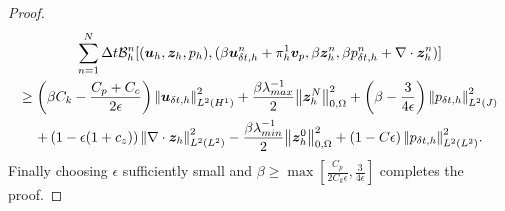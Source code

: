 \begin{proof}
\begin{multline}
\sum_{n=1}^{N} \Delta t  \mathcal{B}_{h}^{n}[\disctriple, ( \beta \dispdisctimediscn + \projscott {\vp},  \beta \fluxdisc^{n}, \beta\pdisctimediscn   + \nabla \cdot \fluxdisc^{n}  )]  \\
\geq \left( \beta C_{k}  - \frac{C_{p}+C_{c}}{2 \epsilon } \right) \honetimenorm{\dispdisctimedisc}^{2}    + \frac{\beta\lambda_{max}^{-1}}{2} \ltwonorm{\fluxdisc^{N}}^{2}  +\left(\beta -   \frac{3}{4 \epsilon}\right) \jtimenorm{\pdisctimedisc}^{2} \\
+ \left(1 -  {\epsilon}(1+c_{z})\right) \ltwotimenorm{\nabla \cdot \fluxdisc }^{2} -\frac{ \beta \lambda_{min}^{-1} }{2}\ltwonorm{\fluxdisc^{0}}^{2}  + \left(1-C{\epsilon}\right) \ltwotimenorm{\pdisctimedisc}^{2}.
\label{eqn:lemmabstar_final}
\end{multline}
Finally choosing $\epsilon$ sufficiently small and $\beta \geq \max \left[ \frac{C_{p}}{2 C_{k} \epsilon }, \frac{3}{4 \epsilon }\right] $ completes the proof.

\end{proof}


